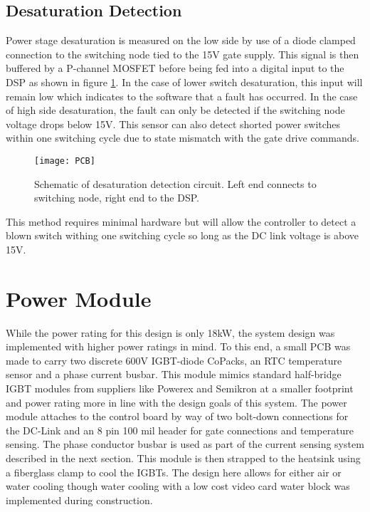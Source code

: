 \subsection{Desaturation Detection}
Power stage desaturation is measured on the low side by use of a diode clamped
connection to the switching node tied to the 15V gate supply.
This signal is then buffered by a P-channel MOSFET before being fed into a
digital input to the DSP as shown in figure \ref{figDesat}.
In the case of lower switch desaturation, this input will remain low which
indicates to the software that a fault has occurred.
In the case of high side desaturation, the fault can only be detected if the
switching node voltage drops below 15V.
This sensor can also detect shorted power switches within one switching cycle
due to state mismatch with the gate drive commands.

\begin{figure}[htbp]
\centering
\label{figDesat}
\texttt{[image: PCB]}
\caption{Schematic of desaturation detection circuit. Left end connects to
switching node, right end to the DSP.}
\end{figure}

This method requires minimal hardware but will allow the controller to detect
a blown switch withing one switching cycle so long as the DC link voltage is
above 15V.


\section{Power Module}
While the power rating for this design is only 18kW, the system design was
implemented with higher power ratings in mind.
To this end, a small PCB was made to carry two discrete 600V IGBT-diode
CoPacks, an RTC temperature sensor and a phase current busbar.
This module mimics standard half-bridge IGBT modules from suppliers like
Powerex and Semikron at a smaller footprint and power rating more in line with
the design goals of this system.
The power module attaches to the control board by way of two bolt-down
connections for the DC-Link and an 8 pin 100 mil header for gate connections
and temperature sensing.
The phase conductor busbar is used as part of the current sensing system
described in the next section.
This module is then strapped to the heatsink using a fiberglass clamp to cool
the IGBTs.
The design here allows for either air or water cooling though water cooling
with a low cost video card water block was implemented during construction.

